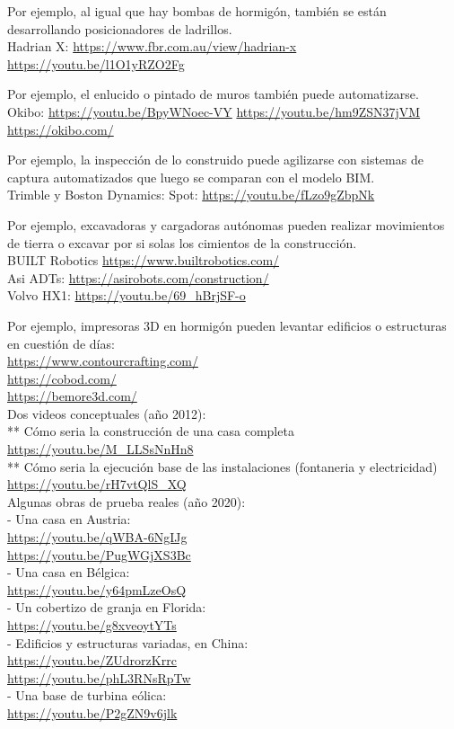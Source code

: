 \documentclass[spanish,12pt,a4paper,final,oneside]{book}
\begin{document}
Por ejemplo, al igual que hay bombas de hormigón, también se están desarrollando posicionadores de ladrillos.
\\Hadrian X: \url{https://www.fbr.com.au/view/hadrian-x}
\\ \url{https://youtu.be/l1O1yRZO2Fg}

Por ejemplo, el enlucido o pintado de muros también puede automatizarse.
\\Okibo: \url{https://youtu.be/BpyWNoec-VY} \hspace{1cm} \url{https://youtu.be/hm9ZSN37jVM}
\\ \url{https://okibo.com/}

Por ejemplo, la inspección de lo construido puede agilizarse con sistemas de captura automatizados que luego se comparan con el modelo BIM.
\\Trimble y Boston Dynamics: Spot: \url{https://youtu.be/fLzo9gZbpNk}

Por ejemplo, excavadoras y cargadoras autónomas pueden realizar movimientos de tierra o excavar por si solas los cimientos de la construcción.
\\BUILT Robotics \url{https://www.builtrobotics.com/}
\\Asi ADTs: \url{https://asirobots.com/construction/}
\\Volvo HX1: \url{https://youtu.be/69_hBrjSF-o}

Por ejemplo, impresoras 3D en hormigón pueden levantar edificios o estructuras en cuestión de días:
\\ \url{https://www.contourcrafting.com/}
\\ \url{https://cobod.com/}
\\ \url{https://bemore3d.com/}
\\Dos videos conceptuales (año 2012):
\\ ** Cómo seria la construcción de una casa completa \\ \url{https://youtu.be/M_LLSsNnHn8}
\\ ** Cómo seria la ejecución base de las instalaciones (fontaneria y electricidad) \\ \url{https://youtu.be/rH7vtQlS_XQ}
\\Algunas obras de prueba reales (año 2020):
\\ - Una casa en Austria: \\ \url{https://youtu.be/qWBA-6NgIJg} \\ \url{https://youtu.be/PugWGjXS3Bc}
\\ - Una casa en Bélgica: \\\url{https://youtu.be/y64pmLzeOsQ}
\\ - Un cobertizo de granja en Florida: \\ \url{https://youtu.be/g8xveoytYTs} 
\\ - Edificios y estructuras variadas, en China: \\ \url{https://youtu.be/ZUdrorzKrrc} \\ \url{https://youtu.be/phL3RNsRpTw}
\\ - Una base de turbina eólica: \\ \url{https://youtu.be/P2gZN9v6jlk}
\end{document}

